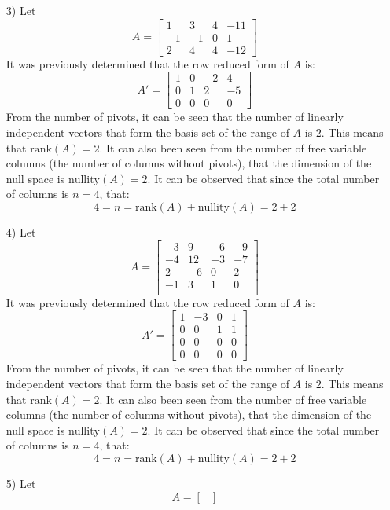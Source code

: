 \documentclass{article}
\begin{document}
\begin{itemize}
\item[3)] Let \[A = \begin{bmatrix}
 1 &  3 &  4 & -11 \\
-1 & -1 & 0 &    1 \\
 2 &  4 & 4 & -12 
\end{bmatrix}\]
It was previously determined that the row reduced form of \(A\) is: 
\[A' = \begin{bmatrix}
1 & 0 & -2 &  4 \\
0 & 1 &  2 & -5 \\
0 & 0 &  0 &  0 
\end{bmatrix}\]
From the number of pivots, it can be seen that the number of linearly independent vectors that form the basis set of the range of \(A\) is \(2\). This means that \(\text{rank}(A) = 2\). It can also been seen from the number of free variable columns (the number of columns without pivots), that the dimension of the null space is \(\text{nullity}(A) = 2\). It can be observed that since the total number of columns is \(n = 4\), that:
\[4 = n = \text{rank}(A) + \text{nullity}(A) = 2 + 2\] 
\item[4)] Let \[A = \begin{bmatrix}
-3 &   9 & -6 & -9 \\
-4 & 12 & -3 & -7 \\
 2 &  -6 &  0 &  2 \\ 
-1 &   3 &  1 &  0 \\
\end{bmatrix}\]
It was previously determined that the row reduced form of \(A\) is: 
\[A' = \begin{bmatrix}
1 & -3 & 0 & 1 \\
0 &  0 & 1 & 1 \\
0 &  0 & 0 & 0 \\ 
0 &  0 & 0 & 0
\end{bmatrix}\]
From the number of pivots, it can be seen that the number of linearly independent vectors that form the basis set of the range of \(A\) is \(2\). This means that \(\text{rank}(A) = 2\). It can also been seen from the number of free variable columns (the number of columns without pivots), that the dimension of the null space is \(\text{nullity}(A) = 2\). It can be observed that since the total number of columns is \(n = 4\), that:
\[4 = n = \text{rank}(A) + \text{nullity}(A) = 2 + 2\] 
\item[5)] Let \[A = \begin{bmatrix}

\end{bmatrix}\]
\end{itemize}
\end{document}
